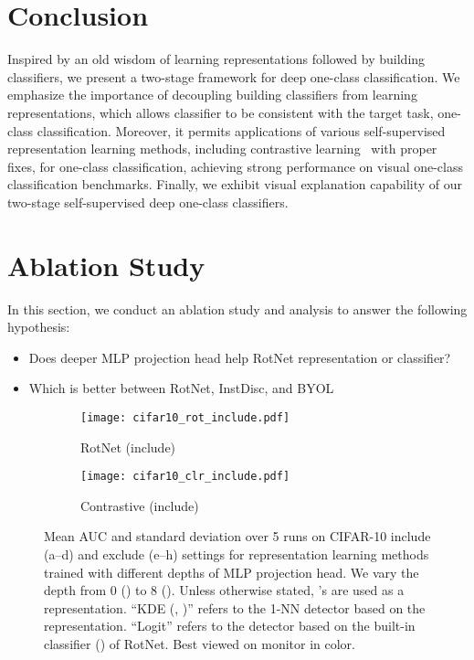 \documentclass{article} \usepackage{iclr2021_conference,times}
\newcommand{\geotrans}{RotNet}
\begin{document}
\vspace{-0.1in}
\section{Conclusion}
\label{sec:conclusion}
\vspace{-0.05in}

Inspired by an old wisdom of learning representations followed by building classifiers, we present a two-stage framework for deep one-class classification. We emphasize the importance of decoupling building classifiers from learning representations, which allows classifier to be consistent with the target task, one-class classification. Moreover, it permits applications of various self-supervised representation learning methods, including contrastive learning~\citep{chen2020simple} with proper fixes, for one-class classification, achieving strong performance on visual one-class classification benchmarks. Finally, we exhibit visual explanation capability of our two-stage self-supervised deep one-class classifiers.


\iffalse
\section{Ablation Study}
In this section, we conduct an ablation study and analysis to answer the following hypothesis:
\begin{itemize}
    \item Does deeper MLP projection head help {\geotrans} representation or classifier?
    \item Which is better between {\geotrans}, InstDisc, and BYOL 
\end{itemize}

\begin{figure}[t]
    \centering
    \begin{subfigure}{.33\textwidth}
        \texttt{[image: cifar10\_rot\_include.pdf]}
        \caption{{\geotrans} (include)}
        \label{fig:cifar10_rot_include}
    \end{subfigure}
    \begin{subfigure}{.33\textwidth}
        \texttt{[image: cifar10\_clr\_include.pdf]}
        \caption{Contrastive (include)}
        \label{fig:cifar10_clr_include}
    \end{subfigure}
    \caption{Mean AUC and standard deviation over 5 runs on CIFAR-10 include (a--d) and exclude (e--h) settings for representation learning methods trained with different depths of MLP projection head. We vary the depth from 0 () to 8 (). Unless otherwise stated, 's are used as a representation. ``KDE (, )'' refers to the 1-NN detector based on the  representation. ``Logit'' refers to the detector based on the built-in classifier () of {\geotrans}. Best viewed on monitor in color.}
    \label{fig:auc_vs_mlp_head}
\end{figure}
\end{document}
